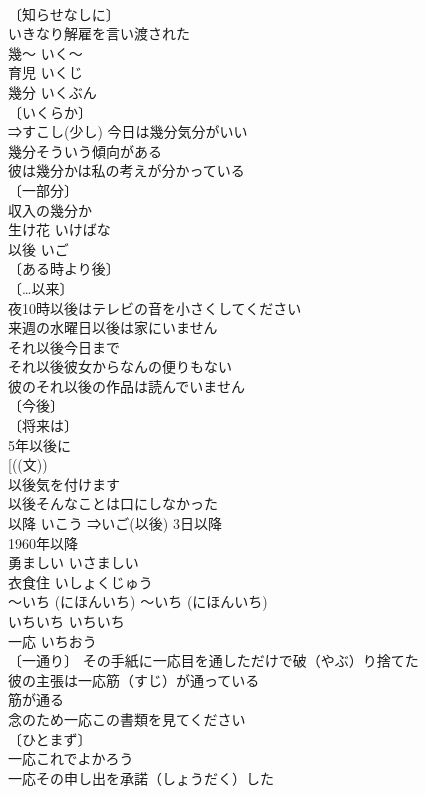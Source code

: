 \documentclass[8pt]{extreport}
\begin{document}
\begin{CJK}{UTF8}{min}
\\	〔知らせなしに〕
\\	いきなり解雇を言い渡された 
\\	幾～	いく～	
\\	育児	いくじ	
\\	幾分	いくぶん	
\\	〔いくらか〕
\\	⇒すこし(少し) 今日は幾分気分がいい 
\\	幾分そういう傾向がある 
\\	彼は幾分かは私の考えが分かっている 
\\	〔一部分〕
\\	収入の幾分か 
\\	生け花	いけばな	
\\	以後	いご	
\\	〔ある時より後〕
\\	〔…以来〕
\\	夜10時以後はテレビの音を小さくしてください 
\\	来週の水曜日以後は家にいません 
\\	それ以後今日まで 
\\	それ以後彼女からなんの便りもない 
\\	彼のそれ以後の作品は読んでいません 
\\	〔今後〕
\\	〔将来は〕
\\	5年以後に 
\\	[((文))
\\	以後気を付けます 
\\	以後そんなことは口にしなかった 
\\	以降	いこう	⇒いご(以後) 3日以降 
\\	1960年以降 
\\	勇ましい	いさましい	
\\	衣食住	いしょくじゅう	
\\	～いち (にほんいち)	～いち (にほんいち)	
\\	いちいち	いちいち	
\\	一応	いちおう	
\\	〔一通り〕 その手紙に一応目を通しただけで破（やぶ）り捨てた 
\\	彼の主張は一応筋（すじ）が通っている 
\\	筋が通る　
\\	念のため一応この書類を見てください 
\\	〔ひとまず〕　
\\	一応これでよかろう 
\\	一応その申し出を承諾（しょうだく）した 

\end{CJK}
\end{document}
